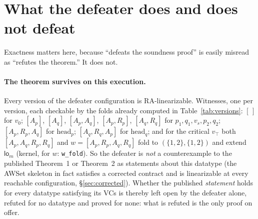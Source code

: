 \documentclass[11pt]{article}
\newcommand{\lom}{\mathsf{lo}_m}
\newcommand{\lean}[1]{\texttt{#1}}
\newcommand{\Ap}{A_p}
\newcommand{\Aq}{A_q}
\newcommand{\Rp}{R_p}
\newcommand{\Rq}{R_q}
\begin{document}
\section{What the defeater does and does not defeat}
\label{sec:scope}

Exactness matters here, because ``defeats the soundness proof'' is
easily misread as ``refutes the theorem.'' It does not.

\paragraph{The theorem survives on this execution.} Every version of
the defeater configuration is RA-linearizable. Witnesses, one per
version, each checkable by the folds already computed in
Table~\ref{tab:versions}: $[\,]$ for $v_0$; $[\Ap]$, $[\Aq]$,
$[\Ap,\Aq]$, $[\Ap,\Rp]$, $[\Aq,\Rq]$ for $p_1, q_1, v_s, p_2, q_2$;
$[\Ap,\Rp,\Aq]$ for $\mathrm{head}_p$; $[\Aq,\Rq,\Ap]$ for
$\mathrm{head}_q$; and for the critical $v_\top$ both
$[\Ap,\Aq,\Rp,\Rq]$ and $w = [\Ap,\Rp,\Aq,\Rq]$ fold to
$(\{1,2\},\{1,2\})$ and extend $\lom$ (kernel, for $w$:
\lean{w\_fold}). So the defeater is \emph{not} a counterexample to the
published Theorem~1 or Theorem~2 as statements about this datatype
(the AWSet skeleton in fact satisfies a corrected contract and is
linearizable at every reachable configuration,
\S\ref{sec:corrected}). Whether the published \emph{statement} holds
for every datatype satisfying its VCs is thereby left open by the
defeater alone, refuted for no datatype and proved for none: what is
refuted is the only proof on offer.
\end{document}
